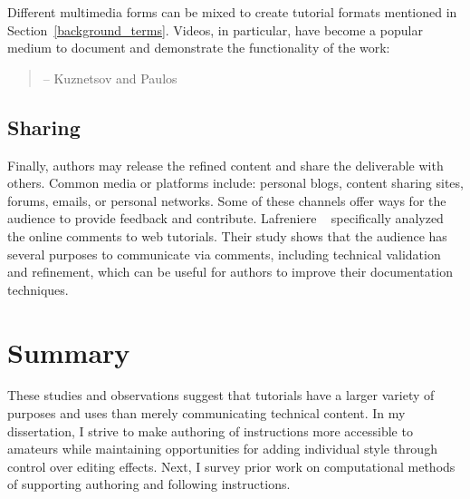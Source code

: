 Different multimedia forms can be mixed to create tutorial formats mentioned in Section~\ref{background_terms}. Videos, in particular, have become a popular medium to document and demonstrate the functionality of the work:

\begin{quote}
 -- Kuznetsov and Paulos~\cite{Kuznetsov:2010:REA:1868914.1868950}
\end{quote}

\subsection{Sharing}
Finally, authors may release the refined content and share the deliverable with others. Common media or platforms include: personal blogs, content sharing sites, forums, emails, or personal networks.
%
Some of these channels offer ways for the audience to provide feedback and contribute. Lafreniere \ea{}~\cite{Lafreniere:2012tl} specifically analyzed the online comments to web tutorials. Their study shows that the audience has several purposes to communicate via comments, including technical validation and refinement, which can be useful for authors to improve their documentation techniques.


\section{Summary}

These studies and observations suggest that tutorials have a larger variety of purposes and uses than merely communicating technical content.
%
In my dissertation, I strive to make authoring of instructions more accessible to amateurs while maintaining opportunities for adding individual style through control over editing effects.
%
Next, I survey prior work on computational methods of supporting authoring and following instructions.
